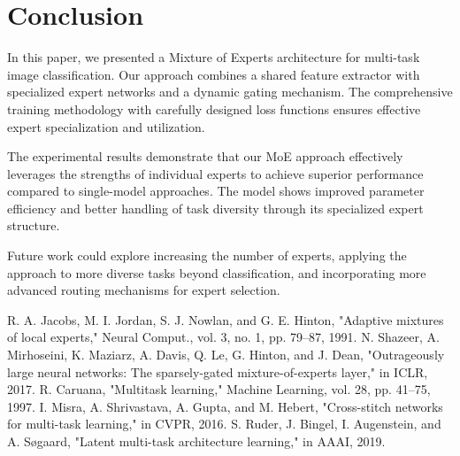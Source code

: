 \documentclass[conference]{IEEEtran}
\begin{document}
\section{Conclusion}
In this paper, we presented a Mixture of Experts architecture for multi-task image classification. Our approach combines a shared feature extractor with specialized expert networks and a dynamic gating mechanism. The comprehensive training methodology with carefully designed loss functions ensures effective expert specialization and utilization.

The experimental results demonstrate that our MoE approach effectively leverages the strengths of individual experts to achieve superior performance compared to single-model approaches. The model shows improved parameter efficiency and better handling of task diversity through its specialized expert structure.

Future work could explore increasing the number of experts, applying the approach to more diverse tasks beyond classification, and incorporating more advanced routing mechanisms for expert selection.


\begin{thebibliography}{00}
 R. A. Jacobs, M. I. Jordan, S. J. Nowlan, and G. E. Hinton, "Adaptive mixtures of local experts," Neural Comput., vol. 3, no. 1, pp. 79–87, 1991.
 N. Shazeer, A. Mirhoseini, K. Maziarz, A. Davis, Q. Le, G. Hinton, and J. Dean, "Outrageously large neural networks: The sparsely-gated mixture-of-experts layer," in ICLR, 2017.
 R. Caruana, "Multitask learning," Machine Learning, vol. 28, pp. 41–75, 1997.
 I. Misra, A. Shrivastava, A. Gupta, and M. Hebert, "Cross-stitch networks for multi-task learning," in CVPR, 2016.
 S. Ruder, J. Bingel, I. Augenstein, and A. Søgaard, "Latent multi-task architecture learning," in AAAI, 2019.
\end{thebibliography}
\end{document}
